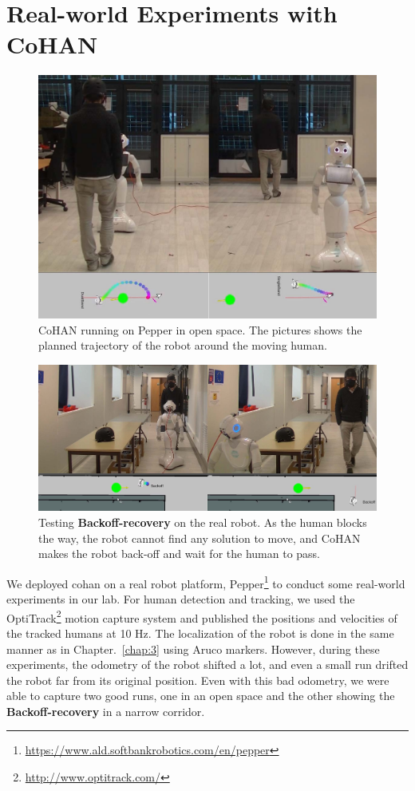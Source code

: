 \section{Real-world Experiments with CoHAN}
\label{real_chap4}
\begin{figure}[h!]
    \centering
    \includegraphics[width=0.9\columnwidth]{images/chapter4/wide_real.jpg}
    \caption{CoHAN running on Pepper in open space. The pictures shows the planned trajectory of the robot around the moving human.}
    \label{fig:real_exp}
\end{figure}

\begin{figure}[h!]
    \centering
    \includegraphics[width=0.9\columnwidth]{images/chapter4/backoff_real.jpg}
    \caption{Testing \textbf{Backoff-recovery} on the real robot. As the human blocks the way, the robot cannot find any solution to move, and CoHAN makes the robot back-off and wait for the human to pass.}
    \label{fig:real_backoff}
\end{figure}
We deployed \acrshort{cohan} on a real robot platform, Pepper\footnote{\url{https://www.ald.softbankrobotics.com/en/pepper}} to conduct some real-world experiments in our lab. For human detection and tracking, we used the OptiTrack\footnote{\url{http://www.optitrack.com/}} motion capture system and published the positions and velocities of the tracked humans at 10 Hz. The localization of the robot is done in the same manner as in Chapter.~\ref{chap:3} using Aruco markers. However, during these experiments, the odometry of the robot shifted a lot, and even a small run drifted the robot far from its original position. Even with this bad odometry, we were able to capture two good runs, one in an open space and the other showing the \textbf{Backoff-recovery} in a narrow corridor.

